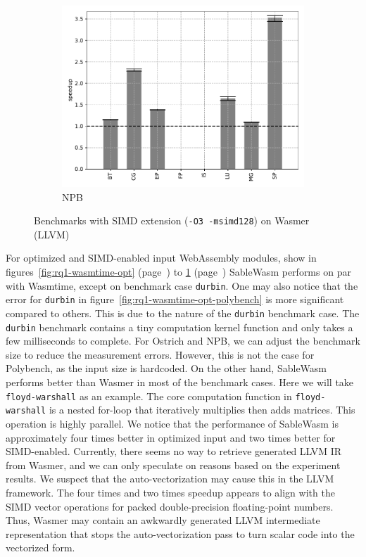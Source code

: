 \begin{figure}
\begin{subfigure}[t]{.45\textwidth}
        \includegraphics[width=\textwidth]
        {Images/6.1.RQ1/npb-wasmer-llvm-simd.pdf}
        \caption{NPB}
    \end{subfigure}
    \caption{Benchmarks with SIMD extension (\texttt{-O3 -msimd128}) on Wasmer
        (LLVM)}
    \label{fig:rq1-wasmer-llvm-simd}
\end{figure}

For optimized and SIMD-enabled input WebAssembly modules,
show in figures~\ref{fig:rq1-wasmtime-opt} (page~\pageref{fig:rq1-wasmtime-opt})
to \ref{fig:rq1-wasmer-llvm-simd} (page~\pageref{fig:rq1-wasmer-llvm-simd})
SableWasm performs on par with Wasmtime, except on benchmark case
\texttt{durbin}. One may also notice that the error for \texttt{durbin} in
figure~\ref{fig:rq1-wasmtime-opt-polybench} is more significant compared to
others. This is due to the nature of the \texttt{durbin} benchmark case.
The \texttt{durbin} benchmark contains a tiny computation kernel function and
only takes a few milliseconds to complete. For Ostrich and NPB, we can adjust
the benchmark size to reduce the measurement errors. However, this is not the
case for Polybench, as the input size is hardcoded. On the other hand,
SableWasm performs better than Wasmer in most of the benchmark cases. Here we
will take \texttt{floyd-warshall} as an example. The core computation
function in \texttt{floyd-warshall} is a nested for-loop that iteratively
multiplies then adds matrices. This operation is highly parallel. We notice
that the performance of SableWasm is approximately four times better in
optimized input and two times better for SIMD-enabled. Currently, there
seems no way to retrieve generated LLVM IR from Wasmer, and we can only
speculate on reasons based on the experiment results. We suspect that the
auto-vectorization may cause this in the LLVM framework. The four times and two
times speedup appears to align with the SIMD vector operations for packed
double-precision floating-point numbers. Thus, Wasmer may contain an awkwardly
generated LLVM intermediate representation that stops the auto-vectorization
pass to turn scalar code into the vectorized form.

